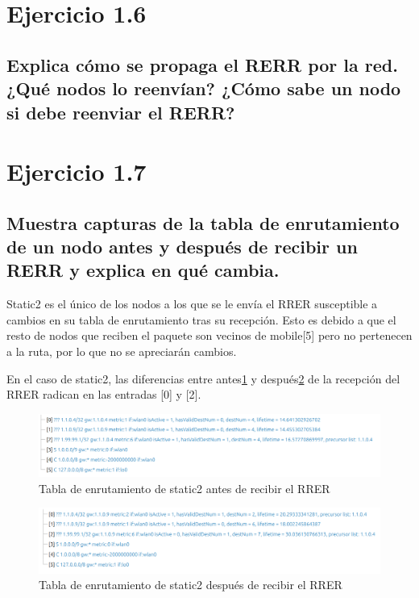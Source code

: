 \vspace{1.25cm}
\section{Ejercicio 1.6}

\subsection{Explica cómo se propaga el RERR por la red. ¿Qué nodos lo reenvían? ¿Cómo sabe un nodo si debe reenviar
el RERR?}



\vspace{1.25cm}
\section{Ejercicio 1.7} 

\subsection{Muestra capturas de la tabla de enrutamiento de un nodo antes y después de recibir un RERR y explica en
qué cambia.}

Static2 es el único de los nodos a los que se le envía el RRER susceptible a cambios en su tabla de enrutamiento tras su recepción. Esto es debido a que el resto de nodos que reciben el paquete son vecinos de mobile[5] pero no pertenecen a la ruta, por lo que no se apreciarán cambios.

En el caso de static2, las diferencias entre antes\ref{fig:RerrRouteTablePre} y después\ref{fig:RerrRouteTablePos} de la recepción del RRER radican en las entradas [0] y [2]. 

\begin{figure}[H]
    \centering
    \includegraphics[width=125mm, scale=0.75]{imaxes/ejercicio7_1.png}
    \caption{Tabla de enrutamiento de static2 antes de recibir el RRER}
    \label{fig:RerrRouteTablePre}
\end{figure}

\begin{figure}[H]
    \centering
    \includegraphics[width=125mm, scale=0.75]{imaxes/ejercicio7_2.png}
    \caption{Tabla de enrutamiento de static2 después de recibir el RRER}
    \label{fig:RerrRouteTablePos}
\end{figure}

